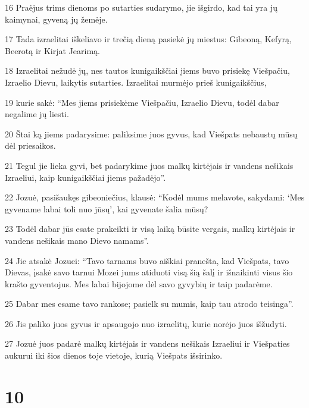 \par 16 Praėjus trims dienoms po sutarties sudarymo, jie išgirdo, kad tai yra jų kaimynai, gyveną jų žemėje. 
\par 17 Tada izraelitai iškeliavo ir trečią dieną pasiekė jų miestus: Gibeoną, Kefyrą, Beerotą ir Kirjat Jearimą. 
\par 18 Izraelitai nežudė jų, nes tautos kunigaikščiai jiems buvo prisiekę Viešpačiu, Izraelio Dievu, laikytis sutarties. Izraelitai murmėjo prieš kunigaikščius, 
\par 19 kurie sakė: “Mes jiems prisiekėme Viešpačiu, Izraelio Dievu, todėl dabar negalime jų liesti. 
\par 20 Štai ką jiems padarysime: paliksime juos gyvus, kad Viešpats nebaustų mūsų dėl priesaikos. 
\par 21 Tegul jie lieka gyvi, bet padarykime juos malkų kirtėjais ir vandens nešikais Izraeliui, kaip kunigaikščiai jiems pažadėjo”. 
\par 22 Jozuė, pasišaukęs gibeoniečius, klausė: “Kodėl mums melavote, sakydami: ‘Mes gyvename labai toli nuo jūsų’, kai gyvenate šalia mūsų? 
\par 23 Todėl dabar jūs esate prakeikti ir visą laiką būsite vergais, malkų kirtėjais ir vandens nešikais mano Dievo namams”. 
\par 24 Jie atsakė Jozuei: “Tavo tarnams buvo aiškiai pranešta, kad Viešpats, tavo Dievas, įsakė savo tarnui Mozei jums atiduoti visą šią šalį ir išnaikinti visus šio krašto gyventojus. Mes labai bijojome dėl savo gyvybių ir taip padarėme. 
\par 25 Dabar mes esame tavo rankose; pasielk su mumis, kaip tau atrodo teisinga”. 
\par 26 Jis paliko juos gyvus ir apsaugojo nuo izraelitų, kurie norėjo juos išžudyti. 
\par 27 Jozuė juos padarė malkų kirtėjais ir vandens nešikais Izraeliui ir Viešpaties aukurui iki šios dienos toje vietoje, kurią Viešpats išsirinko.



\chapter{10}


